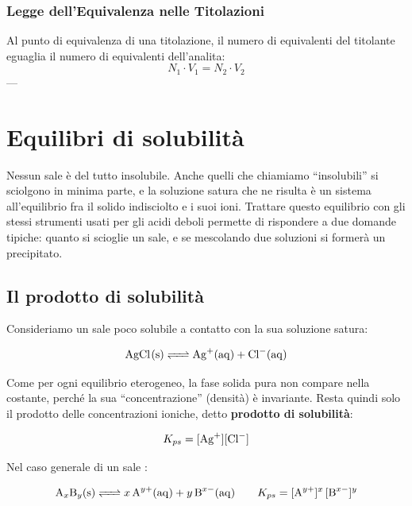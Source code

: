\documentclass[11pt, a4paper, openright]{book}
\begin{document}
\subsection{Legge dell'Equivalenza nelle Titolazioni}
Al punto di equivalenza di una titolazione, il numero di equivalenti del titolante eguaglia il numero di equivalenti dell'analita:
\begin{equation}
N_1 \cdot V_1 = N_2 \cdot V_2
\end{equation}
---

\chapter{Equilibri di solubilità}

Nessun sale è del tutto insolubile. Anche quelli che chiamiamo ``insolubili'' si
sciolgono in minima parte, e la soluzione satura che ne risulta è un sistema
all'equilibrio fra il solido indisciolto e i suoi ioni. Trattare questo equilibrio con
gli stessi strumenti usati per gli acidi deboli permette di rispondere a due domande
tipiche: quanto si scioglie un sale, e se mescolando due soluzioni si formerà un
precipitato.

\section{Il prodotto di solubilità}

Consideriamo un sale poco solubile a contatto con la sua soluzione satura:

\begin{equation*}
  \ce{AgCl(s) <=> Ag+(aq) + Cl-(aq)}
\end{equation*}

Come per ogni equilibrio eterogeneo, la fase solida pura non compare nella costante,
perché la sua ``concentrazione'' (densità) è invariante. Resta quindi solo il prodotto
delle concentrazioni ioniche, detto \textbf{prodotto di solubilità}:

\begin{equation}
  K_{ps} = [\ce{Ag+}][\ce{Cl-}]
\end{equation}

Nel caso generale di un sale :

\begin{equation}
  \ce{A_xB_y(s) <=> $x$ A^{y+}(aq) + $y$ B^{x-}(aq)}
  \qquad
  K_{ps} = [\ce{A^{y+}}]^x \, [\ce{B^{x-}}]^y
  \label{eq:kps}
\end{equation}
\end{document}
